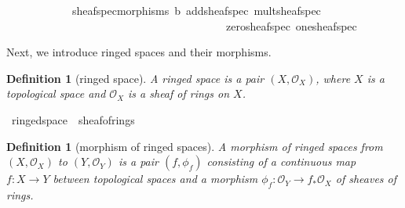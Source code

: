 \documentclass[12pt]{scrartcl}
\newtheorem{definition}[proposition]{Definition}
\begin{document}
\begin{isabelle}
\ \ \ \ \ \ \ \ \ \ \ \ sheaf{\isacharunderscore}{\kern0pt}spec{\isacharunderscore}{\kern0pt}morphisms\ {\isasymO}b\ add{\isacharunderscore}{\kern0pt}sheaf{\isacharunderscore}{\kern0pt}spec\ mult{\isacharunderscore}{\kern0pt}sheaf{\isacharunderscore}{\kern0pt}spec\ \isanewline
\ \ \ \ \ \ \ \ \ \ \ \ \ \ \ \ \ \ \ \ \ \ \ \ \ \ \ \ \ \ \ \ \ \ \ \ \ \ \ \ zero{\isacharunderscore}{\kern0pt}sheaf{\isacharunderscore}{\kern0pt}spec\ one{\isacharunderscore}{\kern0pt}sheaf{\isacharunderscore}{\kern0pt}spec{\isachardoublequoteclose}
\end{isabelle}

Next, we introduce ringed spaces and their morphisms.

\begin{definition}[ringed space]
	A ringed space is a pair $(X, \mathscr{O}_X)$, where $X$ is a topological space and $\mathscr{O}_X$ is a sheaf of rings on $X$.
\end{definition}


\begin{isabelle}
\isamarkupfalse%
\ ringed{\isacharunderscore}{\kern0pt}space\ {\isacharequal}{\kern0pt}\ sheaf{\isacharunderscore}{\kern0pt}of{\isacharunderscore}{\kern0pt}rings
\end{isabelle}

\begin{definition}[morphism of ringed spaces]
	A morphism of ringed spaces from $(X, \mathscr{O}_X)$ to $(Y, \mathscr{O}_Y)$ is a pair $(f, \phi_f)$ consisting of a continuous map $f: X \rightarrow Y$ between topological spaces and a morphism $\phi_f: \mathscr{O}_Y \rightarrow f_{*} \mathscr{O}_X$ of sheaves of rings.   
\end{definition}
\end{document}
